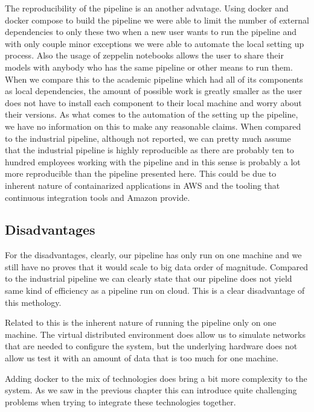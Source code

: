 The reproducibility of the pipeline is an another advatage.
Using docker and docker compose to build the pipeline we were able to limit the number of external dependencies to only these two when a new user wants to run the pipeline and with only couple minor exceptions we were able to automate the local setting up process.
Also the usage of zeppelin notebooks allows the user to share their models with anybody who has the same pipeline or other means to run them.
When we compare this to the academic pipeline which had all of its components as local dependencies, the amount of possible work is greatly smaller as the user does not have to install each component to their local machine and worry about their versions.
As what comes to the automation of the setting up the pipeline, we have no information on this to make any reasonable claims.
When compared to the industrial pipeline, although not reported, we can pretty much assume that the industrial pipeline is highly reproducible as there are probably ten to hundred employees working with the pipeline and in this sense is probably a lot more reproducible than the pipeline presented here.
This could be due to inherent nature of containarized applications in AWS and the tooling that continuous integration tools and Amazon provide.

\subsection{Disadvantages}

For the disadvantages, clearly, our pipeline has only run on one machine and we still have no proves that it would scale to big data order of magnitude.
Compared to the industrial pipeline we can clearly state that our pipeline does not yield same kind of efficiency as a pipeline run on cloud.
This is a clear disadvantage of this methology.

Related to this is the inherent nature of running the pipeline only on one machine.
The virtual distributed environment does allow us to simulate networks that are needed to configure the system, but the underlying hardware does not allow us test it with an amount of data that is too much for one machine.

Adding docker to the mix of technologies does bring a bit more complexity to the system.
As we saw in the previous chapter this can introduce quite challenging problems when trying to integrate these technologies together.



